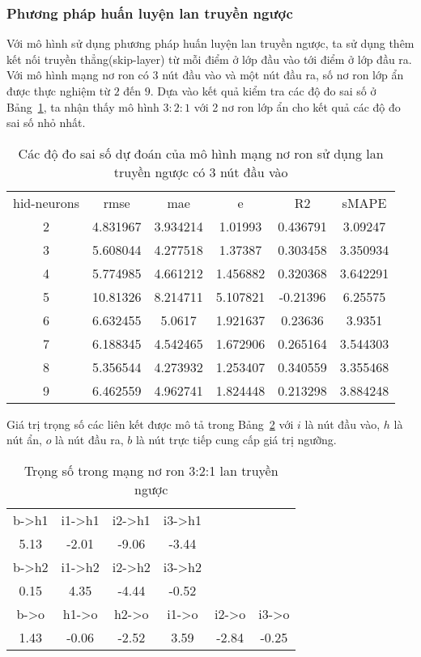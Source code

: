 \subsubsection{Phương pháp huấn luyện lan truyền ngược}
Với mô hình sử dụng phương pháp huấn luyện lan truyền ngược, ta sử dụng thêm kết nối truyền thẳng(skip-layer) từ mỗi điểm ở lớp đầu vào tới điểm ở lớp đầu ra. Với mô hình mạng nơ ron có 3 nút đầu vào và một nút đầu ra, số nơ ron lớp ẩn được thực nghiệm từ $2$ đến $9$. Dựa vào kết quả kiểm tra các độ đo sai số ở Bảng~\ref{nn_err}, ta nhận thấy mô hình $3:2:1$ với 2 nơ ron lớp ẩn cho kết quả các độ đo sai số nhỏ nhất. 

\begin{table}[htbp]
  \centering
  \caption{Các độ đo sai số dự đoán của mô hình mạng nơ ron sử dụng lan truyền ngược có 3 nút đầu vào}
    \begin{tabular}{cccccc}
    \\hid-neurons & rmse  & mae   & e     & R2    & sMAPE  \\
    2     & 4.831967 & 3.934214 & 1.01993 & 0.436791 & 3.09247 \\
    3     & 5.608044 & 4.277518 & 1.37387 & 0.303458 & 3.350934 \\
    4     & 5.774985 & 4.661212 & 1.456882 & 0.320368 & 3.642291 \\
    5     & 10.81326 & 8.214711 & 5.107821 & -0.21396 & 6.25575 \\
    6     & 6.632455 & 5.0617 & 1.921637 & 0.23636 & 3.9351 \\
    7     & 6.188345 & 4.542465 & 1.672906 & 0.265164 & 3.544303 \\
    8     & 5.356544 & 4.273932 & 1.253407 & 0.340559 & 3.355468 \\
    9     & 6.462559 & 4.962741 & 1.824448 & 0.213298 & 3.884248 \\
    \end{tabular}%
  \label{nn_err}%
\end{table}%

Giá trị trọng số các liên kết được mô tả trong Bảng~\ref{nn_weight} với $i$ là nút đầu vào, $h$ là nút ẩn, $o$ là nút đầu ra, $b$ là nút trực tiếp cung cấp giá trị ngưỡng.
  \begin{table}[htbp]
  \centering
  \caption{Trọng số trong mạng nơ ron 3:2:1 lan truyền ngược}
    \begin{tabular}{cccccc}
    b->h1 & i1->h1 & i2->h1 & i3->h1 &       &  \\
    5.13  & -2.01 & -9.06 & -3.44 &       &  \\ \hline
    b->h2 & i1->h2 & i2->h2 & i3->h2 &       &  \\
    0.15  & 4.35  & -4.44 & -0.52 &       &  \\ \hline
    b->o  & h1->o & h2->o & i1->o & i2->o & i3->o \\
    1.43  & -0.06 & -2.52 & 3.59  & -2.84 & -0.25 \\
    \end{tabular}%
  \label{nn_weight}%
\end{table}%
 
